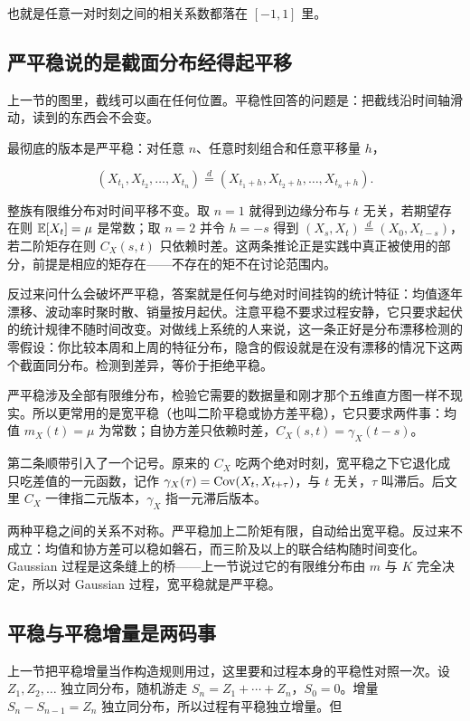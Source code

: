 也就是任意一对时刻之间的相关系数都落在 \([-1,1]\) 里。

\subsection{严平稳说的是截面分布经得起平移}

上一节的图里，截线可以画在任何位置。平稳性回答的问题是：把截线沿时间轴滑动，读到的东西会不会变。

最彻底的版本是严平稳：对任意 \(n\)、任意时刻组合和任意平移量 \(h\)，

\[
(X_{t_1}, X_{t_2}, \ldots, X_{t_n}) \overset{d}{=} (X_{t_1+h}, X_{t_2+h}, \ldots, X_{t_n+h}).
\]

整族有限维分布对时间平移不变。取 \(n=1\) 就得到边缘分布与 \(t\) 无关，若期望存在则 \(\mathbb{E}[X_t]=\mu\) 是常数；取 \(n=2\) 并令 \(h=-s\) 得到 \((X_s,X_t)\overset{d}{=}(X_0,X_{t-s})\)，若二阶矩存在则 \(C_X(s,t)\) 只依赖时差。这两条推论正是实践中真正被使用的部分，前提是相应的矩存在——不存在的矩不在讨论范围内。

反过来问什么会破坏严平稳，答案就是任何与绝对时间挂钩的统计特征：均值逐年漂移、波动率时聚时散、销量按月起伏。注意平稳不要求过程安静，它只要求起伏的统计规律不随时间改变。对做线上系统的人来说，这一条正好是分布漂移检测的零假设：你比较本周和上周的特征分布，隐含的假设就是在没有漂移的情况下这两个截面同分布。检测到差异，等价于拒绝平稳。

严平稳涉及全部有限维分布，检验它需要的数据量和刚才那个五维直方图一样不现实。所以更常用的是宽平稳（也叫二阶平稳或协方差平稳），它只要求两件事：均值 \(m_X(t)=\mu\) 为常数；自协方差只依赖时差，\(C_X(s,t)=\gamma_X(t-s)\)。

第二条顺带引入了一个记号。原来的 \(C_X\) 吃两个绝对时刻，宽平稳之下它退化成只吃差值的一元函数，记作 \(\gamma_X(\tau)=\operatorname{Cov}(X_t, X_{t+\tau})\)，与 \(t\) 无关，\(\tau\) 叫滞后。后文里 \(C_X\) 一律指二元版本，\(\gamma_X\) 指一元滞后版本。

两种平稳之间的关系不对称。严平稳加上二阶矩有限，自动给出宽平稳。反过来不成立：均值和协方差可以稳如磐石，而三阶及以上的联合结构随时间变化。Gaussian 过程是这条缝上的桥——上一节说过它的有限维分布由 \(m\) 与 \(K\) 完全决定，所以对 Gaussian 过程，宽平稳就是严平稳。

\subsection{平稳与平稳增量是两码事}

上一节把平稳增量当作构造规则用过，这里要和过程本身的平稳性对照一次。设 \(Z_1,Z_2,\ldots\) 独立同分布，随机游走 \(S_n = Z_1+\cdots+Z_n\)，\(S_0=0\)。增量 \(S_n - S_{n-1} = Z_n\) 独立同分布，所以过程有平稳独立增量。但

